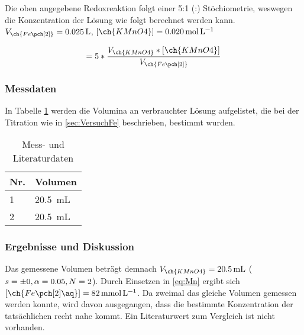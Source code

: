 \documentclass{article}
\begin{document}
        Die oben angegebene Redoxreaktion folgt einer 5:1 (:) Stöchiometrie, weswegen die Konzentration der  Lösung wie folgt berechnet werden kann. $V_{\ch{Fe\pch[2]}} = \SI[mode=text]{0.025}{\liter}$, $[\ch{KMnO4}] = \SI[mode=text]{0.020}{\mole\per\liter}$
        
        \begin{equation}
           [\ch{Fe\pch[2]\aq}] = 5 * \frac{V_{\ch{KMnO4}} * [\ch{KMnO4}]}{V_{\ch{Fe\pch[2]}}} \label{eq:Mn}
         \end{equation}
         
      \subsubsection{Messdaten}
        
        In Tabelle \ref{tab:MessdatenFe} werden die Volumina an verbrauchter  Lösung aufgelistet, die bei der Titration wie in \ref{sec:VersuchFe} beschrieben, bestimmt wurden. 
        
        \begin{table}[H]
          \centering
          \caption[Messdaten der Bestimmung der Konzentration einer Eisen(II)-Lösung, Quelle: Autor]{Mess- und Literaturdaten}
          \label{tab:MessdatenFe}
            \begin{tabular}{@{}l|l@{}}
              \toprule
               Nr. & Volumen \\ \midrule
               1 & \SI[mode=text]{20.5}{\milli\liter} \\
               2 & \SI[mode=text]{20.5}{\milli\liter}  \\ \bottomrule
            \end{tabular}
        \end{table} 
        
      \subsubsection{Ergebnisse und Diskussion} \label{sec:ErgebnisseMang} 
      
        Das gemessene Volumen beträgt demnach $V_{\ch{KMnO4}} = \SI[mode=text]{20.5}{\milli\liter}$ ($s = \num{\pm 0}, \alpha=0.05,N=2$). Durch Einsetzen in \eqref{eq:Mn} ergibt sich $[\ch{Fe\pch[2]\aq}] = \SI[mode=text]{82}{\milli\mole\per\liter}$. Da zweimal das gleiche Volumen gemessen werden konnte, wird davon ausgegangen, dass die bestimmte Konzentration der tatsächlichen recht nahe kommt. Ein Literaturwert zum Vergleich ist nicht vorhanden. \\
        
\end{document}
